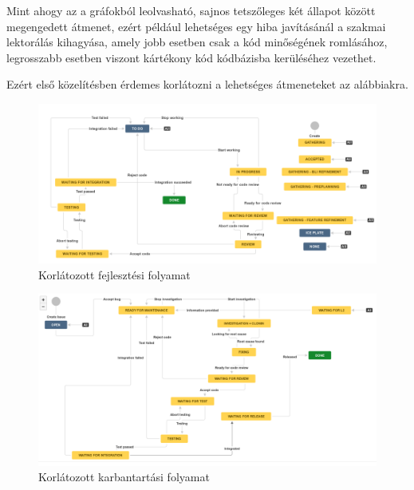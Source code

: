 Mint ahogy az a gráfokból leolvasható, sajnos tetszőleges két állapot között megengedett átmenet,
ezért például lehetséges egy hiba javításánál a szakmai lektorálás kihagyása, amely jobb esetben
csak a kód minőségének romlásához, legrosszabb esetben viszont kártékony kód kódbázisba kerüléséhez
vezethet.

Ezért első közelítésben érdemes korlátozni a lehetséges átmeneteket az alábbiakra.

\begin{figure}[h]
    \includegraphics[width=\textwidth, keepaspectratio]{figures/newfeature.png}
    \centering
    \caption{Korlátozott fejlesztési folyamat}
    \label{fig:newfeature}
\end{figure}

\begin{figure}[h]
    \includegraphics[width=\textwidth, keepaspectratio]{figures/newmt.png}
    \centering
    \caption{Korlátozott karbantartási folyamat}
    \label{fig:newmt}
\end{figure}

\FloatBarrier


